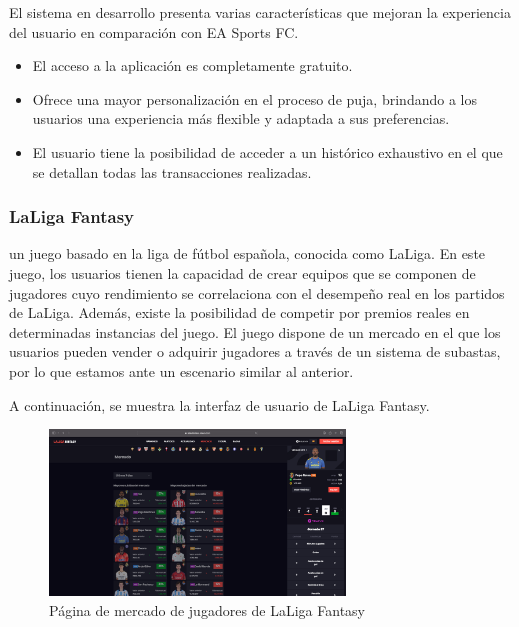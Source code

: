 El sistema en desarrollo presenta varias características que mejoran la experiencia del usuario en comparación con EA Sports FC.

\begin{itemize}
    \item El acceso a la aplicación es completamente gratuito.
    \item Ofrece una mayor personalización en el proceso de puja, brindando a los usuarios una experiencia más flexible y adaptada a sus preferencias.
    \item El usuario tiene la posibilidad de acceder a un histórico exhaustivo en el que se detallan todas las transacciones realizadas.
\end{itemize}

\subsubsection{LaLiga Fantasy}
 un juego basado en la liga de fútbol española, conocida como LaLiga. En este juego, los usuarios tienen la capacidad de crear equipos que se componen de jugadores cuyo rendimiento se correlaciona con el desempeño real en los partidos de LaLiga. Además, existe la posibilidad de competir por premios reales en determinadas instancias del juego.
El juego dispone de un mercado en el que los usuarios pueden vender o adquirir jugadores a través de un sistema de subastas, por lo que estamos ante un escenario similar al anterior.

A continuación, se muestra la interfaz de usuario de LaLiga Fantasy.
\begin{figure}[H]
    \centering
    \includegraphics[width=0.7\textwidth]{figures/4-Estudio-viabilidad/4_LaLigaFantasy.png}
    \caption{Página de mercado de jugadores de LaLiga Fantasy}
    \label{fig:la_liga_fantasy}
    \hypertarget{fig:la_liga_fantasy}{}
\end{figure}

